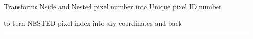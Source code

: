 \begin{related}
  \begin{sulist}{} %
  \item[\htmlref{nest2uniq}{sub:nest2uniq}] Transforms Nside and Nested pixel number into Unique \healpix pixel ID number
  \item[\htmlref{pix2xxx, ...}{sub:pix_tools}] to turn NESTED pixel index into sky coordinates and back
  \end{sulist}
\end{related}

\rule{\hsize}{2mm}

